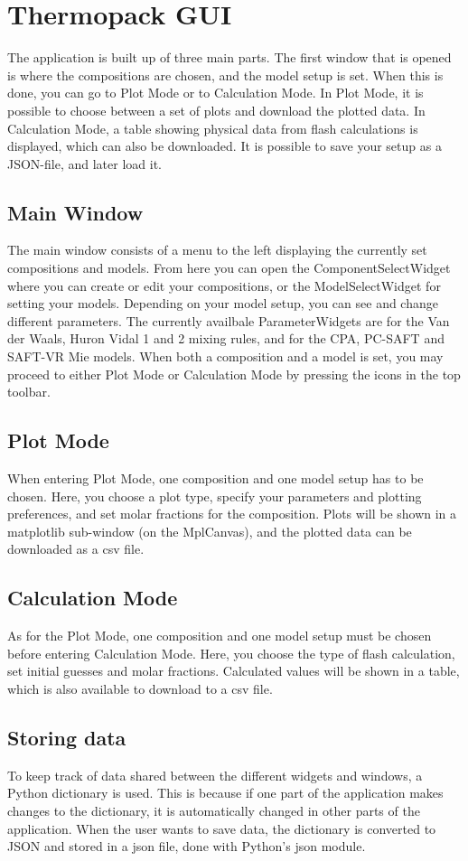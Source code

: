 \section{Thermopack GUI}

The application is built up of three main parts. The first window that is opened is where the compositions are chosen, and the model setup is set. When this is done, you can go to Plot Mode or to Calculation Mode. In Plot Mode, it is possible to choose between a set of plots and download the plotted data. In Calculation Mode, a table showing physical data from flash calculations is displayed, which can also be downloaded. It is possible to save your setup as a JSON-file, and later load it.

\subsection{Main Window}
The main window consists of a menu to the left displaying the currently set compositions and models. From here you can open the ComponentSelectWidget where you can create or edit your compositions, or the ModelSelectWidget for setting your models. Depending on your model setup, you can see and change different parameters. The currently availbale ParameterWidgets are for the Van der Waals, Huron Vidal 1 and 2 mixing rules, and for the CPA, PC-SAFT and SAFT-VR Mie models. When both a composition and a model is set, you may proceed to either Plot Mode or Calculation Mode by pressing the icons in the top toolbar.

\subsection{Plot Mode}
When entering Plot Mode, one composition and one model setup has to be chosen. Here, you choose a plot type, specify your parameters and plotting preferences, and set molar fractions for the composition. Plots will be shown in a matplotlib sub-window (on the MplCanvas), and the plotted data can be downloaded as a csv file.

\subsection{Calculation Mode}
As for the Plot Mode, one composition and one model setup must be chosen before entering Calculation Mode. Here, you choose the type of flash calculation, set initial guesses and molar fractions. Calculated values will be shown in a table, which is also available to download to a csv file. 

\subsection{Storing data}

To keep track of data shared between the different widgets and windows, a Python dictionary is used. This is because if one part of the application makes changes to the dictionary, it is automatically changed in other parts of the application. When the user wants to save data, the dictionary is converted to JSON and stored in a json file, done with Python's json module.
